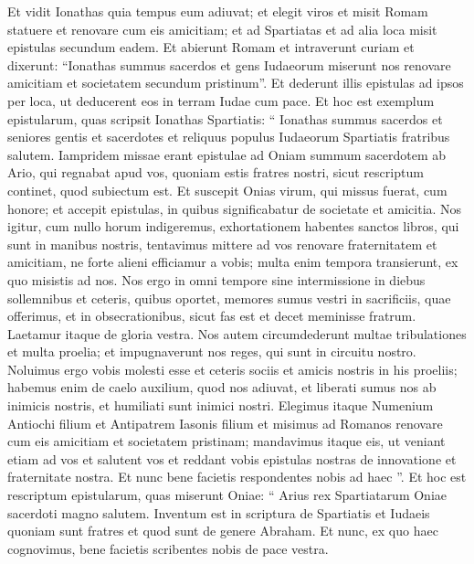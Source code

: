 \begin{biblechapter}
\begin{biblechapter}
\begin{biblechapter}
\begin{biblechapter}
\begin{biblechapter}
\begin{biblechapter}
\begin{biblechapter}
\begin{biblechapter}
\begin{biblechapter}
\begin{biblechapter}
\begin{biblechapter}
\begin{biblechapter}
\verse Et vidit Ionathas quia tempus eum adiuvat; et elegit viros et misit Romam statuere et renovare cum eis amicitiam; 
\verse et ad Spartiatas et ad alia loca misit epistulas secundum eadem. 
\verse Et abierunt Romam et intraverunt curiam et dixerunt: “Ionathas summus sacerdos et gens Iudaeorum miserunt nos renovare amicitiam et societatem secundum pristinum”. 
\verse Et dederunt illis epistulas ad ipsos per loca, ut deducerent eos in terram Iudae cum pace. 
\verse Et hoc est exemplum epistularum, quas scripsit Ionathas Spartiatis: 
\verse “ Ionathas summus sacerdos et seniores gentis et sacerdotes et reliquus populus Iudaeorum Spartiatis fratribus salutem. 
\verse Iampridem missae erant epistulae ad Oniam summum sacerdotem ab Ario, qui regnabat apud vos, quoniam estis fratres nostri, sicut rescriptum continet, quod subiectum est. 
\verse Et suscepit Onias virum, qui missus fuerat, cum honore; et accepit epistulas, in quibus significabatur de societate et amicitia. 
\verse Nos igitur, cum nullo horum indigeremus, exhortationem habentes sanctos libros, qui sunt in manibus nostris, 
 \verse tentavimus mittere ad vos renovare fraternitatem et amicitiam, ne forte alieni efficiamur a vobis; multa enim tempora transierunt, ex quo misistis ad nos. 
\verse Nos ergo in omni tempore sine intermissione in diebus sollemnibus et ceteris, quibus oportet, memores sumus vestri in sacrificiis, quae offerimus, et in obsecrationibus, sicut fas est et decet meminisse fratrum. 
\verse Laetamur itaque de gloria vestra. 
\verse Nos autem circumdederunt multae tribulationes et multa proelia; et impugnaverunt nos reges, qui sunt in circuitu nostro. 
\verse Noluimus ergo vobis molesti esse et ceteris sociis et amicis nostris in his proeliis; 
\verse habemus enim de caelo auxilium, quod nos adiuvat, et liberati sumus nos ab inimicis nostris, et humiliati sunt inimici nostri. 
\verse Elegimus itaque Numenium Antiochi filium et Antipatrem Iasonis filium et misimus ad Romanos renovare cum eis amicitiam et societatem pristinam; 
\verse mandavimus itaque eis, ut veniant etiam ad vos et salutent vos et reddant vobis epistulas nostras de innovatione et fraternitate nostra. 
\verse Et nunc bene facietis respondentes nobis ad haec ”.
 \verse Et hoc est rescriptum epistularum, quas miserunt Oniae: 
\verse “ Arius rex Spartiatarum Oniae sacerdoti magno salutem. 
\verse Inventum est in scriptura de Spartiatis et Iudaeis quoniam sunt fratres et quod sunt de genere Abraham. 
 \verse Et nunc, ex quo haec cognovimus, bene facietis scribentes nobis de pace vestra. 

\end{biblechapter}
\end{biblechapter}
\end{biblechapter}
\end{biblechapter}
\end{biblechapter}
\end{biblechapter}
\end{biblechapter}
\end{biblechapter}
\end{biblechapter}
\end{biblechapter}
\end{biblechapter}
\end{biblechapter}
